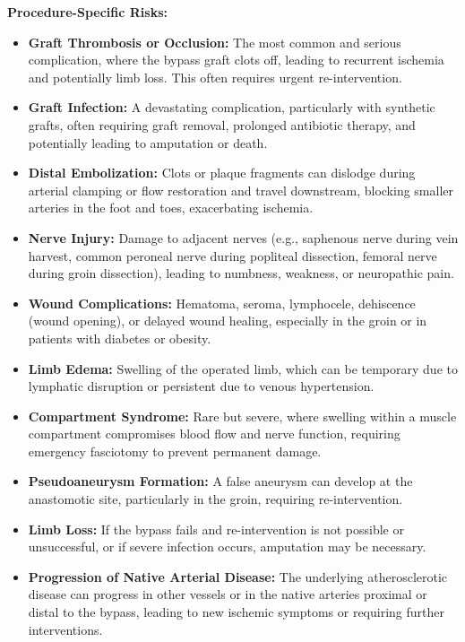 \textbf{Procedure-Specific Risks:}
\begin{itemize}
  \item \textbf{Graft Thrombosis or Occlusion:} The most common and serious complication, where the bypass graft clots off, leading to recurrent ischemia and potentially limb loss. This often requires urgent re-intervention.
  
  \item \textbf{Graft Infection:} A devastating complication, particularly with synthetic grafts, often requiring graft removal, prolonged antibiotic therapy, and potentially leading to amputation or death.
  
  \item \textbf{Distal Embolization:} Clots or plaque fragments can dislodge during arterial clamping or flow restoration and travel downstream, blocking smaller arteries in the foot and toes, exacerbating ischemia.
  
  \item \textbf{Nerve Injury:} Damage to adjacent nerves (e.g., saphenous nerve during vein harvest, common peroneal nerve during popliteal dissection, femoral nerve during groin dissection), leading to numbness, weakness, or neuropathic pain.
  
  \item \textbf{Wound Complications:} Hematoma, seroma, lymphocele, dehiscence (wound opening), or delayed wound healing, especially in the groin or in patients with diabetes or obesity.
  
  \item \textbf{Limb Edema:} Swelling of the operated limb, which can be temporary due to lymphatic disruption or persistent due to venous hypertension.
  
  \item \textbf{Compartment Syndrome:} Rare but severe, where swelling within a muscle compartment compromises blood flow and nerve function, requiring emergency fasciotomy to prevent permanent damage.
  
  \item \textbf{Pseudoaneurysm Formation:} A false aneurysm can develop at the anastomotic site, particularly in the groin, requiring re-intervention.
  
  \item \textbf{Limb Loss:} If the bypass fails and re-intervention is not possible or unsuccessful, or if severe infection occurs, amputation may be necessary.
  
  \item \textbf{Progression of Native Arterial Disease:} The underlying atherosclerotic disease can progress in other vessels or in the native arteries proximal or distal to the bypass, leading to new ischemic symptoms or requiring further interventions.
\end{itemize}

